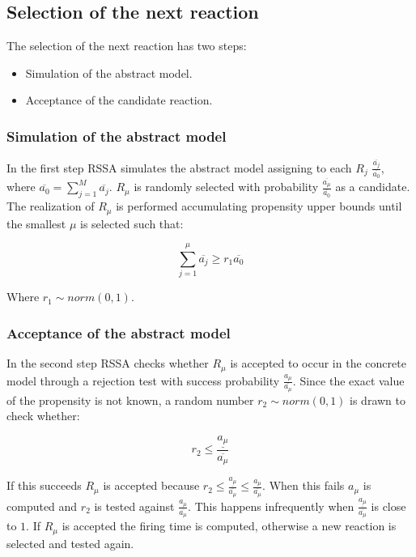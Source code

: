   \subsection{Selection of the next reaction}
  The selection of the next reaction has two steps:

  \begin{multicols}{2}
    \begin{itemize}
      \item Simulation of the abstract model.
      \item Acceptance of the candidate reaction.
    \end{itemize}
  \end{multicols}

    \subsubsection{Simulation of the abstract model}
    In the first step RSSA simulates the abstract model assigning to each $R_j$ $\frac{\overline{a_j}}{\overline{a_0}}$, where $\overline{a_0} = \sum\limits_{j=1}^M\overline{a_j}$.
    $R_\mu$ is randomly selected with probability $\frac{\overline{a_\mu}}{\overline{a_0}}$ as a candidate.
    The realization of $R_\mu$ is performed accumulating propensity upper bounds until the smallest $\mu$ is selected such that:

    $$\sum\limits_{j=1}^\mu\overline{a_j}\ge r_1\overline{a_0}$$

    Where $r_1\sim norm(0,1)$.

    \subsubsection{Acceptance of the abstract model}
    In the second step RSSA checks whether $R_\mu$ is accepted to occur in the concrete model through a rejection test with success probability $\frac{a_\mu}{\overline{a_\mu}}$.
    Since the exact value of the propensity is not known, a random number $r_2\sim norm(0,1)$ is drawn to check whether:

    $$r_2\le \frac{\underline{a_\mu}}{\overline{a_\mu}}$$

    If this succeeds $R_\mu$ is accepted because $r_2\le\frac{\underline{a_\mu}}{\overline{a_\mu}}\le\frac{a_\mu}{\overline{a_\mu}}$.
    When this fails $a_\mu$ is computed and $r_2$ is tested against $\frac{a_\mu}{\overline{a_\mu}}$.
    This happens infrequently when $\frac{\underline{a_\mu}}{\overline{a_\mu}}$ is close to $1$.
    If $R_\mu$ is accepted the firing time is computed, otherwise a new reaction is selected and tested again.

